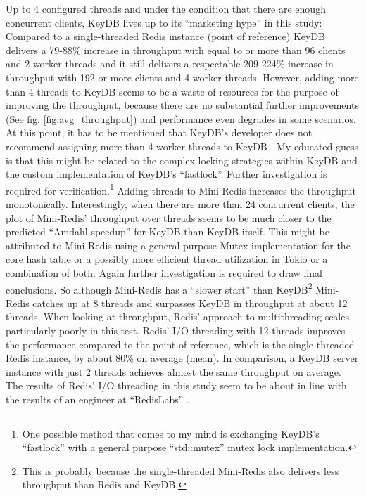 Up to 4 configured threads and under the condition that there are enough concurrent clients, KeyDB lives up to its “marketing hype” in this study: Compared to a single-threaded Redis instance (point of reference) KeyDB delivers a 79-88\% increase in throughput with equal to or more than 96 clients and 2 worker threads and it still delivers a respectable 209-224\% increase in throughput with 192 or more clients and 4 worker threads. However, adding more than 4 threads to KeyDB seems to be a waste of resources for the purpose of improving the throughput, because there are no substantial further improvements (See fig. \ref{fig:avg_throughput}) and performance even degrades in some scenarios. At this point, it has to be mentioned that KeyDB’s developer does not recommend assigning more than 4 worker threads to KeyDB \cite{soft:keydb}. My educated guess is that this might be related to the complex locking strategies within KeyDB and the custom implementation of KeyDB’s “fastlock”. Further investigation is required for verification.\footnote{One possible method that comes to my mind is exchanging KeyDB’s “fastlock” with a general purpose “std::mutex” mutex lock implementation.} \newline
Adding threads to Mini-Redis increases the throughput monotonically. Interestingly, when there are more than 24 concurrent clients, the plot of Mini-Redis’ throughput over threads seems to be much closer to the predicted “Amdahl speedup” for KeyDB than KeyDB itself. This might be attributed to Mini-Redis using a general purpose Mutex implementation for the core hash table or a possibly more efficient thread utilization in Tokio or a combination of both. Again further investigation is required to draw final conclusions. So although Mini-Redis has a “slower start” than KeyDB\footnote{This is probably because the single-threaded Mini-Redis also delivers less throughput than Redis and KeyDB.} Mini-Redis catches up at 8 threads and surpasses KeyDB in throughput at about 12 threads. \newline
When looking at throughput, Redis’ approach to multithreading scales particularly poorly in this test. Redis’ I/O threading with 12 threads improves the performance compared to the point of reference, which is the single-threaded Redis instance, by about 80\% on average (mean). In comparison, a KeyDB server instance with just 2 threads achieves almost the same throughput on average. The results of Redis’ I/O threading in this study seem to be about in line with the results of an engineer at “RedisLabs” \cite{redis:io_thread}.\newline
